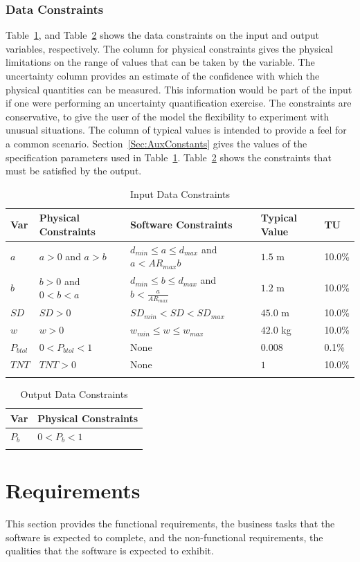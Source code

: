 \documentclass[12pt]{article}
\begin{document}
\subsubsection{Data Constraints}
\label{Sec:DataConstraints}
Table~\ref{Table:InDataConstraints}, and Table~\ref{Table:OutDataConstraints} shows the data constraints on the input and output variables, respectively. The column for physical constraints gives the physical limitations on the range of values that can be taken by the variable. The uncertainty column provides an estimate of the confidence with which the physical quantities can be measured. This information would be part of the input if one were performing an uncertainty quantification exercise. The constraints are conservative, to give the user of the model the flexibility to experiment with unusual situations. The column of typical values is intended to provide a feel for a common scenario. Section~\ref{Sec:AuxConstants} gives the values of the specification parameters used in Table~\ref{Table:InDataConstraints}. Table~\ref{Table:OutDataConstraints} shows the constraints that must be satisfied by the output.
\begin{longtable}{l l l l l}
\toprule
Var & Physical Constraints & Software Constraints & Typical Value & TU
\\
\midrule
$a$ & $a>0$ and $a>b$ & ${d_{min}}\leq{}a\leq{}{d_{max}}$ and $a<{AR_{max}} b$ & $1.5$ m & 10.0\%
\\
$b$ & $b>0$ and $0<b<a$ & ${d_{min}}\leq{}b\leq{}{d_{max}}$ and $b<\frac{a}{{AR_{max}}}$ & $1.2$ m & 10.0\%
\\
$SD$ & $SD>0$ & ${SD_{min}}<SD<{SD_{max}}$ & $45.0$ m & 10.0\%
\\
$w$ & $w>0$ & ${w_{min}}\leq{}w\leq{}{w_{max}}$ & $42.0$ kg & 10.0\%
\\
${P_{btol}}$ & $0<{P_{btol}}<1$ & None & $0.008$ & 0.1\%
\\
$TNT$ & $TNT>0$ & None & $1$ & 10.0\%
\\
\bottomrule
\caption{Input Data Constraints}
\label{Table:InDataConstraints}
\end{longtable}
\begin{longtable}{l l}
\toprule
Var & Physical Constraints
\\
\midrule
${P_{b}}$ & $0<{P_{b}}<1$
\\
\bottomrule
\caption{Output Data Constraints}
\label{Table:OutDataConstraints}
\end{longtable}
\section{Requirements}
\label{Sec:Requirements}
This section provides the functional requirements, the business tasks that the software is expected to complete, and the non-functional requirements, the qualities that the software is expected to exhibit.
\end{document}
